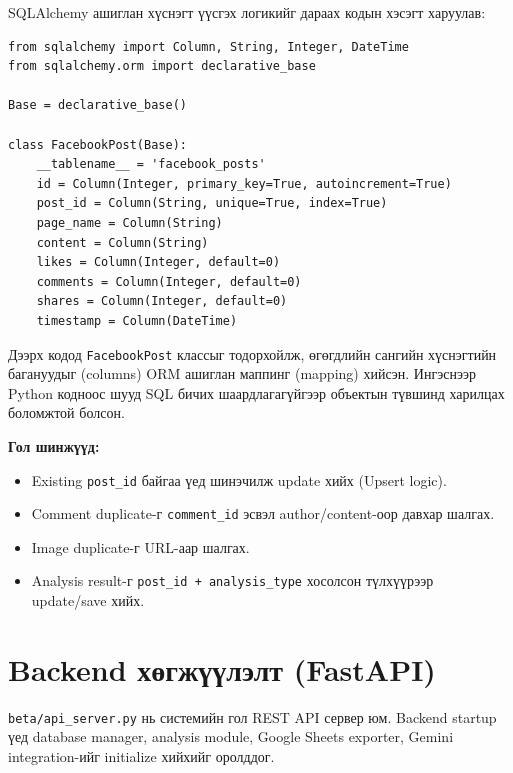 SQLAlchemy ашиглан хүснэгт үүсгэх логикийг дараах кодын хэсэгт харуулав:

\begin{verbatim}
from sqlalchemy import Column, String, Integer, DateTime
from sqlalchemy.orm import declarative_base

Base = declarative_base()

class FacebookPost(Base):
    __tablename__ = 'facebook_posts'
    id = Column(Integer, primary_key=True, autoincrement=True)
    post_id = Column(String, unique=True, index=True)
    page_name = Column(String)
    content = Column(String)
    likes = Column(Integer, default=0)
    comments = Column(Integer, default=0)
    shares = Column(Integer, default=0)
    timestamp = Column(DateTime)
\end{verbatim}

Дээрх кодод \texttt{FacebookPost} классыг тодорхойлж, өгөгдлийн сангийн хүснэгтийн багануудыг (columns) ORM ашиглан маппинг (mapping) хийсэн. Ингэснээр Python кодноос шууд SQL бичих шаардлагагүйгээр объектын түвшинд харилцах боломжтой болсон.

\textbf{Гол шинжүүд:}
\begin{itemize}
    \item Existing \texttt{post\_id} байгаа үед шинэчилж update хийх (Upsert logic).
    \item Comment duplicate-г \texttt{comment\_id} эсвэл author/content-оор давхар шалгах.
    \item Image duplicate-г URL-аар шалгах.
    \item Analysis result-г \texttt{post\_id + analysis\_type} хосолсон түлхүүрээр update/save хийх.
\end{itemize}

\section{Backend хөгжүүлэлт (FastAPI)}

\texttt{beta/api\_server.py} нь системийн гол REST API сервер юм. Backend startup үед database manager, analysis module, Google Sheets exporter, Gemini integration-ийг initialize хийхийг оролддог.

